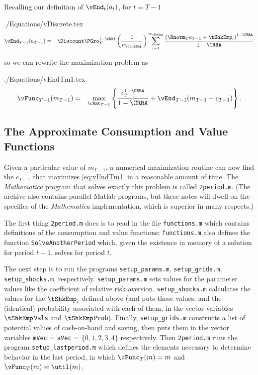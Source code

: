 \documentclass[titlepage]{\econtex}
\newcommand{\Mma}{\textit{Mathematica}}
\begin{document}
Recalling our definition of ${\vEnd}_{t}({a}_{t})$, for $t=T-1$
\begin{verbatimwrite}{./Equations/vDiscrete.tex}
\begin{eqnarray}
        \vEnd_{T-1}({a}_{T-1}) & = &   \Discount \PGro_{T}^{1-\CRRA}\left(\frac{1}{n_{\tShkEmp}}\right)\sum_{i=1}^{n_{\tShkEmp}}   \frac{\left( \Rnorm_{T} {a}_{T-1} + \tShkEmp_{i}\right)^{1-\CRRA}}{1-\CRRA} \label{eq:vDiscrete}
\end{eqnarray}
\end{verbatimwrite}

so we can rewrite the maximization problem as 
\begin{verbatimwrite}{./Equations/vEndTm1.tex}
\begin{eqnarray}
{\vFunc}_{T-1}({m}_{T-1})  & = & \max_{\cRat_{T-1}}
\left\{
\frac{{c}_{T-1}^{1-\CRRA}}{1-\CRRA} +
\vEnd_{T-1}({m}_{T-1}-{c}_{T-1})
\right\}.
 \label{eq:vEndTm1}
\end{eqnarray}
\end{verbatimwrite}


\subsection{The Approximate Consumption and Value Functions}

Given a particular value of ${m}_{T-1}$, a numerical maximization
routine can now find the ${c}_{T-1}$ that maximizes
\eqref{eq:vEndTm1} in a reasonable amount of time.  The {\Mma} program that
solves exactly this problem is called \texttt{2period.m}.  (The archive also contains
parallel Matlab programs, but these notes will dwell on the specifics of the
{\Mma} implementation, which is superior in many respects.)

The first thing \texttt{2period.m} does is to read in the file
\texttt{functions.m} which contains definitions of the consumption and
value functions; \texttt{functions.m} also defines the function \texttt{SolveAnotherPeriod}
which, given the existence in memory of a solution for period $t+1$,
solves for period $t$.

The next step is to
run the programs \texttt{setup\_params.m}, \texttt{setup\_grids.m},
\texttt{setup\_shocks.m}, respectively. \texttt{setup\_params.m} sets values for the
parameter values like the coefficient of relative risk aversion.
\texttt{setup\_shocks.m} calculates the values for the $\tShkEmp_{i}$
defined above (and puts those values, and the (identical) probability associated
with each of them, in the vector variables \texttt{$\tShkEmp$Vals} and
\texttt{$\tShkEmp$Prob}).  Finally, \texttt{setup\_grids.m} constructs a
list of potential values of cash-on-hand and saving, then puts them in the vector
variables \texttt{mVec} = \texttt{aVec} = $\{0,1,2,3,4\}$ respectively.
Then \texttt{2period.m} runs the program \texttt{setup\_lastperiod.m}
which defines the elements necessary to determine behavior in the last
period, in which $\cFunc_{T}(m)=m$ and $\vFunc_{T}(m)=\util(m)$.
\end{document}
